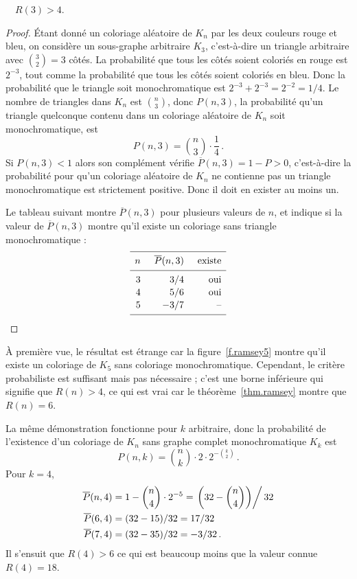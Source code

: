 \begin{theorem}[Erd\H{o}s]
$\quad R(3) > 4$.
\end{theorem}
\begin{proof}
Étant donné un coloriage aléatoire de $K_n$ par les deux couleurs rouge et bleu, on considère un sous-graphe arbitraire $K_3$, c'est-à-dire un triangle arbitraire avec $\binom{3}{2}=3$ côtés. La probabilité que tous les côtés soient coloriés en rouge est $2^{-3}$, tout comme la probabilité que tous les côtés soient coloriés en bleu. Donc la probabilité que le triangle soit monochromatique est $2^{-3}+2^{-3}=2^{-2}=1/4$. Le nombre de triangles dans $K_n$ est $\binom{n}{3}$, donc $P(n,3)$, la probabilité qu'un triangle quelconque contenu dans un coloriage aléatoire de $K_n$ soit monochromatique, est 
\[
P(n,3)=\binom{n}{3}\cdot \frac{1}{4}\,.
\]
Si $P(n,3)<1$ alors son complément vérifie $\overline{P}(n,3)=1-P>0$, c'est-à-dire la probabilité pour qu'un coloriage aléatoire de $K_n$ ne contienne pas un triangle monochromatique est strictement positive. Donc il doit en exister au moins un.

Le tableau suivant montre $\overline{P}(n,3)$ pour plusieurs valeurs de $n$, et indique si la valeur de $\overline{P}(n,3)$ montre qu'il existe un coloriage sans triangle monochromatique :
\[
\renewcommand*{\arraystretch}{1.1}
\begin{array}{r@{\hspace{5mm}}r@{\hspace{5mm}}r}
\hline
\noalign{\smallskip}
n & \overline{P}(n,3) & \text{existe}\\
\noalign{\smallskip}\hline\noalign{\smallskip}
3 & 3/4 & \text{oui} \\
4 & 5/6 & \text{oui}\\
5 & -3/7 & \textrm{--}\\
\noalign{\smallskip}
 \hline
 \end{array}\qedhere
\]
\end{proof}
\`A première vue, le résultat est étrange car la figure~\ref{f.ramsey5} montre qu'il existe un coloriage de $K_5$ sans coloriage monochromatique. Cependant, le critère probabiliste est suffisant mais pas nécessaire ; c'est une borne inférieure qui signifie que $R(n)>4$, ce qui est vrai car le théorème~\ref{thm.ramsey} montre que $R(n)=6$.

La même démonstration fonctionne pour $k$ arbitraire, donc la probabilité de l'existence d'un coloriage de $K_n$ sans graphe complet monochromatique $K_k$ est 
\[
P(n,k)=\binom{n}{k}\cdot 2\cdot 2^{-\binom{k}{2}}\,.
\]
Pour $k=4$,
\begin{align*}
\overline{P}(n,4)&=1-\binom{n}{4}\cdot 2^{-5}=\left.\left(32-\binom{n}{4}\right)\right/32\\
\overline{P}(6,4)&=(32-15)/32=17/32\\
\overline{P}(7,4)&=(32-35)/32=-3/32\,.
\end{align*}
Il s'ensuit que $R(4)>6$ ce qui est beaucoup moins que la valeur connue $R(4)=18$.


